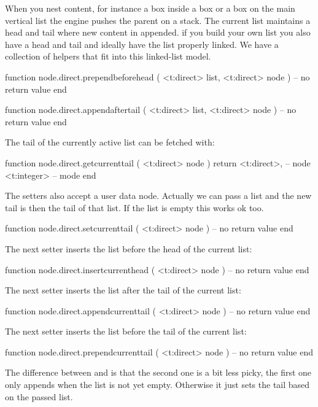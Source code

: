 \stopsubsection

\startsubsection[title={Current lists}]

When you nest content, for instance a box inside a box or a box on the main
vertical list the engine pushes the parent on a stack. The current list maintains
a head and tail where new content in appended. if you build your own list you
also have a head and tail and ideally have the list properly linked. We have a
collection of helpers that fit into this linked-list model.

\starttyping[option=LUA]
function node.direct.prependbeforehead (
    <t:direct> list,
    <t:direct> node
)
    -- no return value
end

function node.direct.appendaftertail (
    <t:direct> list,
    <t:direct> node
)
    -- no return value
end
\stoptyping


The tail of the currently active list can be fetched with:

\starttyping[option=LUA]
function node.direct.getcurrenttail (
    <t:direct> node
)
    return
        <t:direct>, -- node
        <t:integer> -- mode
end
\stoptyping

The setters also accept a user data node. Actually we can pass a list and the new
tail is then the tail of that list. If the list is empty this works ok too.

\starttyping[option=LUA]
function node.direct.setcurrenttail (
    <t:direct> node
)
    -- no return value
end
\stoptyping

The next setter inserts the list before the head of the current list:

\starttyping[option=LUA]
function node.direct.insertcurrenthead (
    <t:direct> node
)
    -- no return value
end
\stoptyping

The next setter inserts the list after the tail of the current list:

\starttyping[option=LUA]
function node.direct.appendcurrenttail (
    <t:direct> node
)
    -- no return value
end
\stoptyping

The next setter inserts the list before the tail of the current list:

\starttyping[option=LUA]
function node.direct.prependcurrenttail (
    <t:direct> node
)
    -- no return value
end
\stoptyping

The difference between  and  is that
the second one is a bit less picky, the first one only appends when the list is
not yet empty. Otherwise it just sets the tail based on the passed list.

